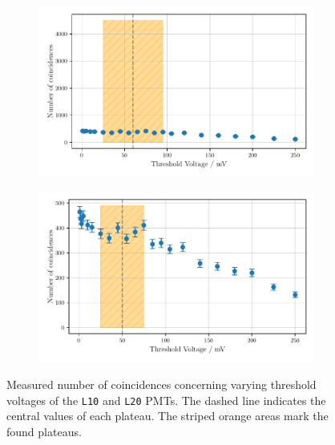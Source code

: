 \begin{figure}
    \centering
    \begin{subfigure}[b]{0.48\textwidth}
        \includegraphics[width=\textwidth]{plots/threshL10_2.pdf}
    \end{subfigure}\hfill
    \begin{subfigure}[b]{0.48\textwidth}
        \includegraphics[width=\textwidth]{plots/threshL20.pdf}
    \end{subfigure}
    \caption{Measured number of coincidences concerning varying threshold voltages
    of the \texttt{L10} and \texttt{L20} PMTs.
    The dashed line indicates the central values of each plateau. The striped orange areas mark the found plateaus.}
    \label{fig:appthresh5}
\end{figure}
